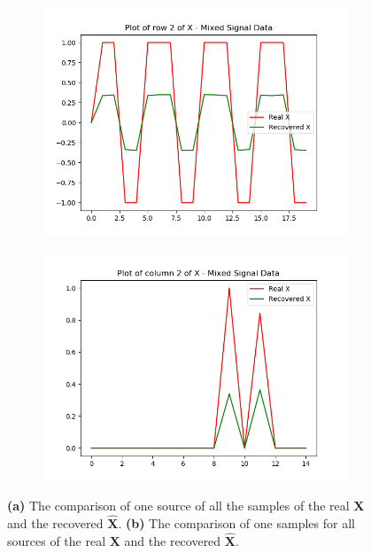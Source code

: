 \begin{figure}[H]
\centering
\begin{subfigure}{0.49\textwidth}
\centering
\includegraphics[width=\textwidth]{figures/cases/case2_1.png}
\caption{}
\label{fig:case2_1}
\end{subfigure}
\begin{subfigure}{0.49\textwidth}
\includegraphics[width=\textwidth]{figures/cases/case2_2.png}
\caption{}
\label{fig:case2_2}
\end{subfigure}
\caption{\textbf{(a)} The comparison of one source of all the samples of the real $\mathbf{X}$ and the recovered $\hat{\mathbf{X}}$. \textbf{(b)} The comparison of one samples for all sources of the real $\mathbf{X}$ and the recovered $\hat{\mathbf{X}}$.}
\end{figure}

